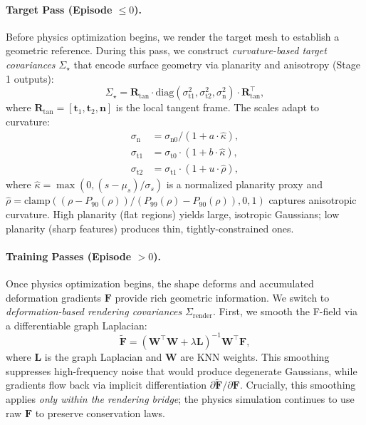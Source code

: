     \paragraph{Target Pass (Episode $\leq 0$).}
    Before physics optimization begins, we render the target mesh to establish a geometric reference. During this pass, we construct \emph{curvature-based target covariances} $\Sigma_\star$ that encode surface geometry via planarity and anisotropy (Stage 1 outputs):
    \begin{equation}
    \label{eq:sigma_target}
    \Sigma_\star = \mathbf{R}_{\text{tan}} \cdot \text{diag}(\sigma_{\text{t1}}^2, \sigma_{\text{t2}}^2, \sigma_{\text{n}}^2) \cdot \mathbf{R}_{\text{tan}}^\top,
    \end{equation}
    where $\mathbf{R}_{\text{tan}}=[\mathbf{t}_1, \mathbf{t}_2, \mathbf{n}]$ is the local tangent frame. The scales adapt to curvature:
    \begin{equation}
    \label{eq:curvature_scales}
    \begin{aligned}
    \sigma_{\text{n}} &= \sigma_{\text{n0}} / (1 + a \cdot \hat{\kappa}), \\
    \sigma_{\text{t1}} &= \sigma_{\text{t0}} \cdot (1 + b \cdot \hat{\kappa}), \\
    \sigma_{\text{t2}} &= \sigma_{\text{t1}} \cdot (1 + u \cdot \hat{\rho}),
    \end{aligned}
    \end{equation}
    where $\hat{\kappa} = \max(0, (s - \mu_s)/\sigma_s)$ is a normalized planarity proxy and $\hat{\rho} = \text{clamp}((\rho - P_{90}(\rho))/(P_{99}(\rho) - P_{90}(\rho)), 0, 1)$ captures anisotropic curvature. High planarity (flat regions) yields large, isotropic Gaussians; low planarity (sharp features) produces thin, tightly-constrained ones.
    
    \paragraph{Training Passes (Episode $> 0$).}
    Once physics optimization begins, the shape deforms and accumulated deformation gradients $\mathbf{F}$ provide rich geometric information. We switch to \emph{deformation-based rendering covariances} $\Sigma_{\text{render}}$. First, we smooth the F-field via a differentiable graph Laplacian:
    \begin{equation}
    \label{eq:F_smooth}
    \tilde{\mathbf{F}} = (\mathbf{W}^\top \mathbf{W} + \lambda \mathbf{L})^{-1} \mathbf{W}^\top \mathbf{F},
    \end{equation}
    where $\mathbf{L}$ is the graph Laplacian and $\mathbf{W}$ are KNN weights. This smoothing suppresses high-frequency noise that would produce degenerate Gaussians, while gradients flow back via implicit differentiation $\partial \tilde{\mathbf{F}}/\partial \mathbf{F}$. Crucially, this smoothing applies \emph{only within the rendering bridge}; the physics simulation continues to use raw $\mathbf{F}$ to preserve conservation laws.
    
